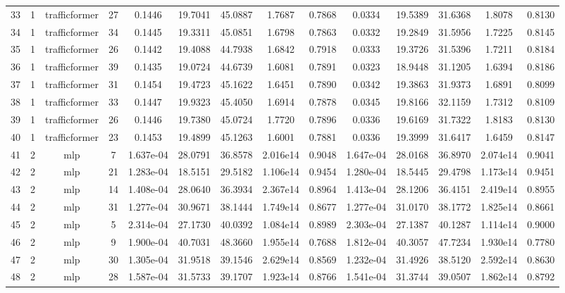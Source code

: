 \begin{landscape}
\begin{longtable}{c | c | c | c | c | c | c | c | c | c | c | c | c | c}
	33 & 1 & trafficformer & 27 & 0.1446 & 19.7041 & 45.0887 & 1.7687 & 0.7868 & 0.0334 & 19.5389 & 31.6368 & 1.8078 & 0.8130 \\
	34 & 1 & trafficformer & 34 & 0.1445 & 19.3311 & 45.0851 & 1.6798 & 0.7863 & 0.0332 & 19.2849 & 31.5956 & 1.7225 & 0.8145 \\
	35 & 1 & trafficformer & 26 & 0.1442 & 19.4088 & 44.7938 & 1.6842 & 0.7918 & 0.0333 & 19.3726 & 31.5396 & 1.7211 & 0.8184 \\
	36 & 1 & trafficformer & 39 & 0.1435 & 19.0724 & 44.6739 & 1.6081 & 0.7891 & 0.0323 & 18.9448 & 31.1205 & 1.6394 & 0.8186 \\
	37 & 1 & trafficformer & 31 & 0.1454 & 19.4723 & 45.1622 & 1.6451 & 0.7890 & 0.0342 & 19.3863 & 31.9373 & 1.6891 & 0.8099 \\
	38 & 1 & trafficformer & 33 & 0.1447 & 19.9323 & 45.4050 & 1.6914 & 0.7878 & 0.0345 & 19.8166 & 32.1159 & 1.7312 & 0.8109 \\
	39 & 1 & trafficformer & 26 & 0.1446 & 19.7380 & 45.0724 & 1.7720 & 0.7896 & 0.0336 & 19.6169 & 31.7322 & 1.8183 & 0.8130 \\
	40 & 1 & trafficformer & 23 & 0.1453 & 19.4899 & 45.1263 & 1.6001 & 0.7881 & 0.0336 & 19.3999 & 31.6417 & 1.6459 & 0.8147 \\
	41 & 2 & mlp & 7 & 1.637e-04 & 28.0791 & 36.8578 & 2.016e14 & 0.9048 & 1.647e-04 & 28.0168 & 36.8970 & 2.074e14 & 0.9041 \\
	42 & 2 & mlp & 21 & 1.283e-04 & 18.5151 & 29.5182 & 1.106e14 & 0.9454 & 1.280e-04 & 18.5445 & 29.4798 & 1.173e14 & 0.9451 \\
	43 & 2 & mlp & 14 & 1.408e-04 & 28.0640 & 36.3934 & 2.367e14 & 0.8964 & 1.413e-04 & 28.1206 & 36.4151 & 2.419e14 & 0.8955 \\
	44 & 2 & mlp & 31 & 1.277e-04 & 30.9671 & 38.1444 & 1.749e14 & 0.8677 & 1.277e-04 & 31.0170 & 38.1772 & 1.825e14 & 0.8661 \\
	45 & 2 & mlp & 5 & 2.314e-04 & 27.1730 & 40.0392 & 1.084e14 & 0.8989 & 2.303e-04 & 27.1387 & 40.1287 & 1.114e14 & 0.9000 \\
	46 & 2 & mlp & 9 & 1.900e-04 & 40.7031 & 48.3660 & 1.955e14 & 0.7688 & 1.812e-04 & 40.3057 & 47.7234 & 1.930e14 & 0.7780 \\
	47 & 2 & mlp & 30 & 1.305e-04 & 31.9518 & 39.1546 & 2.629e14 & 0.8569 & 1.232e-04 & 31.4926 & 38.5120 & 2.592e14 & 0.8630 \\
	48 & 2 & mlp & 28 & 1.587e-04 & 31.5733 & 39.1707 & 1.923e14 & 0.8766 & 1.541e-04 & 31.3744 & 39.0507 & 1.862e14 & 0.8792 \\

\end{longtable}
\end{landscape}
